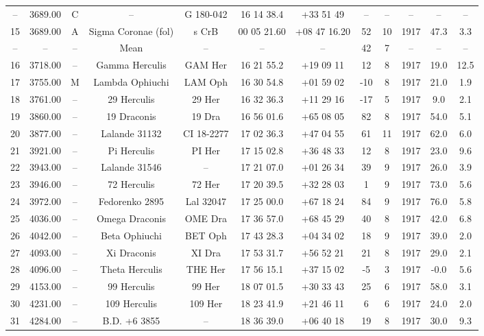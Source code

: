 \begin{table}
\begin{tabular}{cccccccccccc}
-- & 3689.00 & C & -- & G 180-042 & 16 14 38.4 & +33 51 49 & -- & -- & -- & -- & -- \\
15 & 3689.00 & A & Sigma  Coronae (fol) & s CrB & 00 05 21.60 & +08 47 16.20 & 52 & 10 & 1917 & 47.3 & 3.3 \\
-- & -- & -- & Mean & -- & -- & -- & 42 & 7 & -- & -- & -- \\
16 & 3718.00 & -- & Gamma Herculis & GAM Her & 16 21 55.2 & +19 09 11 & 12 & 8 & 1917 & 19.0 & 12.5 \\
17 & 3755.00 & M & Lambda Ophiuchi & LAM Oph & 16 30 54.8 & +01 59 02 & -10 & 8 & 1917 & 21.0 & 1.9 \\
18 & 3761.00 & -- & 29 Herculis & 29 Her & 16 32 36.3 & +11 29 16 & -17 & 5 & 1917 & 9.0 & 2.1 \\
19 & 3860.00 & -- & 19 Draconis & 19 Dra & 16 56 01.6 & +65 08 05 & 82 & 8 & 1917 & 54.0 & 5.1 \\
20 & 3877.00 & -- & Lalande 31132 & CI 18-2277 & 17 02 36.3 & +47 04 55 & 61 & 11 & 1917 & 62.0 & 6.0 \\
21 & 3921.00 & -- & Pi Herculis & PI Her & 17 15 02.8 & +36 48 33 & 12 & 8 & 1917 & 23.0 & 9.6 \\
22 & 3943.00 & -- & Lalande 31546 & -- & 17 21 07.0 & +01 26 34 & 39 & 9 & 1917 & 26.0 & 3.9 \\
23 & 3946.00 & -- & 72 Herculis & 72 Her & 17 20 39.5 & +32 28 03 & 1 & 9 & 1917 & 73.0 & 5.6 \\
24 & 3972.00 & -- & Fedorenko 2895 & Lal 32047 & 17 25 00.0 & +67 18 24 & 84 & 9 & 1917 & 76.0 & 5.8 \\
25 & 4036.00 & -- & Omega Draconis & OME Dra & 17 36 57.0 & +68 45 29 & 40 & 8 & 1917 & 42.0 & 6.8 \\
26 & 4042.00 & -- & Beta Ophiuchi & BET Oph & 17 43 28.3 & +04 34 02 & 18 & 9 & 1917 & 39.0 & 2.0 \\
27 & 4093.00 & -- & Xi Draconis & XI Dra & 17 53 31.7 & +56 52 21 & 21 & 8 & 1917 & 29.0 & 2.1 \\
28 & 4096.00 & -- & Theta Herculis & THE Her & 17 56 15.1 & +37 15 02 & -5 & 3 & 1917 & -0.0 & 5.6 \\
29 & 4153.00 & -- & 99 Herculis & 99 Her & 18 07 01.5 & +30 33 43 & 25 & 6 & 1917 & 58.0 & 3.1 \\
30 & 4231.00 & -- & 109 Herculis & 109 Her & 18 23 41.9 & +21 46 11 & 6 & 6 & 1917 & 24.0 & 2.0 \\
31 & 4284.00 & -- & B.D. +6  3855 & -- & 18 36 39.0 & +06 40 18 & 19 & 8 & 1917 & 30.0 & 9.3 \\

\end{tabular}
\end{table}
